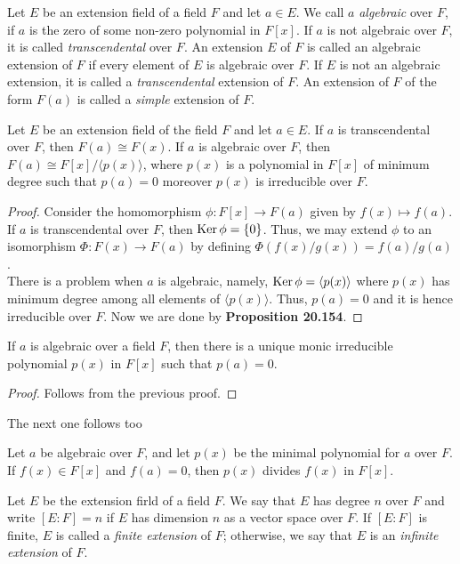 \begin{definition}
	Let $E$ be an extension field of a field $F$ and let $a\in E$. We call $a$ \textit{algebraic} over $F$, if $a$ is the zero of some non-zero polynomial in $F[x]$. If $a$ is not algebraic over $F$, it is called \textit{transcendental} over $F$. An extension $E$ of $F$ is called an algebraic extension of $F$ if every element of $E$ is algebraic over $F$. If $E$ is not an algebraic extension, it is called a \textit{transcendental} extension of $F$. An extension of $F$ of the form $F(a)$ is called a \textit{simple} extension of $F$.
\end{definition}

\begin{proposition}
	Let $E$ be an extension field of the field $F$ and let $a\in E$. If $a$ is transcendental over $F$, then $F(a)\cong F(x)$. If $a$ is algebraic over $F$, then $F(a)\cong F[x]/\langle p(x)\rangle$, where $p(x)$ is a polynomial in $F[x]$ of minimum degree such that $p(a)=0$ moreover $p(x)$ is irreducible over $F$.
\end{proposition}
\begin{proof}
	Consider the homomorphism $\phi:F[x]\to F(a)$ given by $f(x)\mapsto f(a)$. If $a$ is transcendental over $F$, then $\operatorname{Ker}\phi=\{0\}$. Thus, we may extend $\phi$ to an isomorphism $\Phi:F(x)\to F(a)$ by defining $\Phi(f(x)/g(x)) = f(a)/g(a)$.\\
	There is a problem when $a$ is algebraic, namely, $\operatorname{Ker}\phi = \langle p(x)\rangle$ where $p(x)$ has minimum degree among all elements of $\langle p(x)\rangle$. Thus, $p(a)=0$ and it is hence irreducible over $F$. Now we are done by \textbf{Proposition 20.154}.
\end{proof}

\begin{proposition}
	If $a$ is algebraic over a field $F$, then there is a unique monic irreducible polynomial $p(x)$ in $F[x]$ such that $p(a)=0$.
\end{proposition}
\begin{proof}
	Follows from the previous proof.
\end{proof}
The next one follows too
\begin{proposition}
	Let $a$ be algebraic over $F$, and let $p(x)$ be the minimal polynomial for $a$ over $F$. If $f(x)\in F[x]$ and $f(a)=0$, then $p(x)$ divides $f(x)$ in $F[x]$.
\end{proposition}

\begin{definition}
	Let $E$ be the extension firld of a field $F$. We say that $E$ has degree $n$ over $F$ and write $[E:F]=n$ if $E$ has dimension $n$ as a vector space over $F$. If $[E:F]$ is finite, $E$ is called a \textit{finite extension} of $F$; otherwise, we say that $E$ is an \textit{infinite extension} of $F$.
\end{definition}

